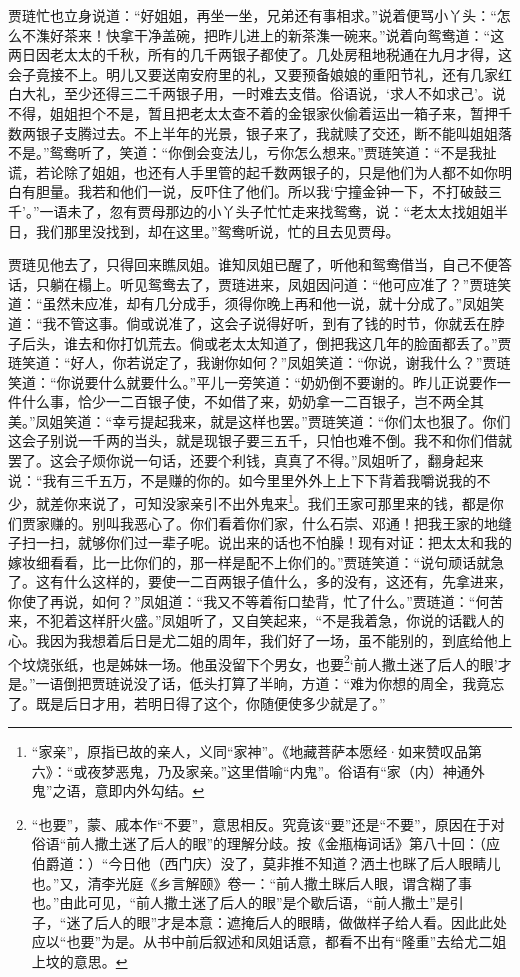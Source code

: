 贾琏忙也立身说道：“好姐姐，再坐一坐，兄弟还有事相求。”说着便骂小丫头：“怎么不潗好茶来！快拿干净盖碗，把昨儿进上的新茶潗一碗来。”说着向鸳鸯道：“这两日因老太太的千秋，所有的几千两银子都使了。几处房租地税通在九月才得，这会子竟接不上。明儿又要送南安府里的礼，又要预备娘娘的重阳节礼，还有几家红白大礼，至少还得三二千两银子用，一时难去支借。俗语说，‘求人不如求己’。说不得，姐姐担个不是，暂且把老太太查不着的金银家伙偷着运出一箱子来，暂押千数两银子支腾过去。不上半年的光景，银子来了，我就赎了交还，断不能叫姐姐落不是。”鸳鸯听了，笑道：“你倒会变法儿，亏你怎么想来。”贾琏笑道：“不是我扯谎，若论除了姐姐，也还有人手里管的起千数两银子的，只是他们为人都不如你明白有胆量。我若和他们一说，反吓住了他们。所以我‘宁撞金钟一下，不打破鼓三千’。”一语未了，忽有贾母那边的小丫头子忙忙走来找鸳鸯，说：“老太太找姐姐半日，我们那里没找到，却在这里。”鸳鸯听说，忙的且去见贾母。

贾琏见他去了，只得回来瞧凤姐。谁知凤姐已醒了，听他和鸳鸯借当，自己不便答话，只躺在榻上。听见鸳鸯去了，贾琏进来，凤姐因问道：“他可应准了？”贾琏笑道：“虽然未应准，却有几分成手，须得你晚上再和他一说，就十分成了。”凤姐笑道：“我不管这事。倘或说准了，这会子说得好听，到有了钱的时节，你就丢在脖子后头，谁去和你打饥荒去。倘或老太太知道了，倒把我这几年的脸面都丢了。”贾琏笑道：“好人，你若说定了，我谢你如何？”凤姐笑道：“你说，谢我什么？”贾琏笑道：“你说要什么就要什么。”平儿一旁笑道：“奶奶倒不要谢的。昨儿正说要作一件什么事，恰少一二百银子使，不如借了来，奶奶拿一二百银子，岂不两全其美。”凤姐笑道：“幸亏提起我来，就是这样也罢。”贾琏笑道：“你们太也狠了。你们这会子别说一千两的当头，就是现银子要三五千，只怕也难不倒。我不和你们借就罢了。这会子烦你说一句话，还要个利钱，真真了不得。”凤姐听了，翻身起来说：“我有三千五万，不是赚的你的。如今里里外外上上下下背着我嚼说我的不少，就差你来说了，可知没家亲引不出外鬼来\footnote{“家亲”，原指已故的亲人，义同“家神”。《地藏菩萨本愿经·如来赞叹品第六》：“或夜梦恶鬼，乃及家亲。”这里借喻“内鬼”。俗语有“家（内）神通外鬼”之语，意即内外勾结。}。我们王家可那里来的钱，都是你们贾家赚的。别叫我恶心了。你们看着你们家，什么石崇、邓通！把我王家的地缝子扫一扫，就够你们过一辈子呢。说出来的话也不怕臊！现有对证：把太太和我的嫁妆细看看，比一比你们的，那一样是配不上你们的。”贾琏笑道：“说句顽话就急了。这有什么这样的，要使一二百两银子值什么，多的没有，这还有，先拿进来，你使了再说，如何？”凤姐道：“我又不等着衔口垫背，忙了什么。”贾琏道：“何苦来，不犯着这样肝火盛。”凤姐听了，又自笑起来，“不是我着急，你说的话戳人的心。我因为我想着后日是尤二姐的周年，我们好了一场，虽不能别的，到底给他上个坟烧张纸，也是姊妹一场。他虽没留下个男女，也要\footnote{“也要”，蒙、戚本作“不要”，意思相反。究竟该“要”还是“不要”，原因在于对俗语“前人撒土迷了后人的眼”的理解分歧。按《金瓶梅词话》第八十回：（应伯爵道：）“今日他（西门庆）没了，莫非推不知道？洒土也眯了后人眼睛儿也。”又，清李光庭《乡言解颐》卷一：“前人撒土眯后人眼，谓含糊了事也。”由此可见，“前人撒土迷了后人的眼”是个歇后语，“前人撒土”是引子，“迷了后人的眼”才是本意：遮掩后人的眼睛，做做样子给人看。因此此处应以“也要”为是。从书中前后叙述和凤姐话意，都看不出有“隆重”去给尤二姐上坟的意思。}‘前人撒土迷了后人的眼’才是。”一语倒把贾琏说没了话，低头打算了半晌，方道：“难为你想的周全，我竟忘了。既是后日才用，若明日得了这个，你随便使多少就是了。”

